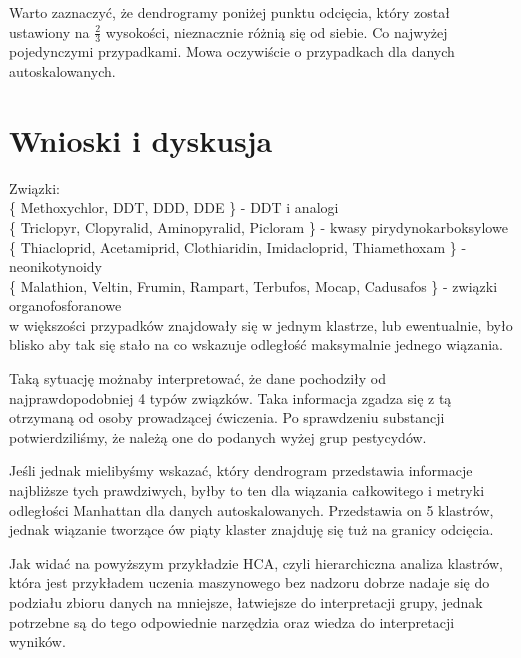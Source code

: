 \documentclass[12pt, a4paper]{article}
\begin{document}
    Warto zaznaczyć, że dendrogramy poniżej punktu odcięcia, który został ustawiony na $\frac{2}{3}$ wysokości, nieznacznie różnią się od siebie. Co najwyżej pojedynczymi przypadkami.
    Mowa oczywiście o przypadkach dla danych autoskalowanych.

\section{Wnioski i dyskusja}

    Związki: 
    \\\{ Methoxychlor, DDT, DDD, DDE \} - DDT i analogi
    \\\{ Triclopyr, Clopyralid, Aminopyralid, Picloram \} - kwasy pirydynokarboksylowe
    \\\{ Thiacloprid, Acetamiprid, Clothiaridin, Imidacloprid, Thiamethoxam \} - neonikotynoidy
    \\\{ Malathion, Veltin, Frumin, Rampart, Terbufos, Mocap, Cadusafos \} - związki organofosforanowe
    \\w większości przypadków znajdowały się w jednym klastrze, lub ewentualnie, było blisko aby tak się stało na co wskazuje odległość maksymalnie
    jednego wiązania.

    Taką sytuację możnaby interpretować, że dane pochodziły od najprawdopodobniej 4 typów związków. Taka informacja zgadza się z tą otrzymaną od osoby prowadzącej ćwiczenia.
    Po sprawdzeniu substancji potwierdziliśmy, że należą one do podanych wyżej grup pestycydów.

    Jeśli jednak mielibyśmy wskazać, który dendrogram przedstawia informacje najbliższe tych prawdziwych, byłby to ten dla wiązania całkowitego
    i metryki odległości Manhattan dla danych autoskalowanych. Przedstawia on 5 klastrów, jednak wiązanie tworzące ów piąty klaster znajduję się
    tuż na granicy odcięcia.

    Jak widać na powyższym przykładzie HCA, czyli hierarchiczna analiza klastrów, która jest przykładem uczenia maszynowego bez nadzoru dobrze nadaje się
    do podziału zbioru danych na mniejsze, łatwiejsze do interpretacji grupy, jednak potrzebne są do tego odpowiednie narzędzia oraz wiedza do interpretacji wyników.
\end{document}
